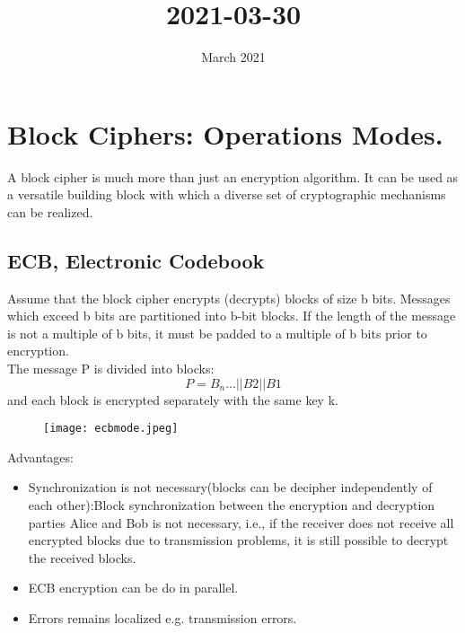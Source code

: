 \documentclass{article}
\title{2021-03-30}
\author{}
\date{March 2021}
\begin{document}
\maketitle

\section{Block Ciphers: Operations Modes.}
A block cipher is much more than just an encryption algorithm. It can be used as a versatile building block with which a diverse set of cryptographic mechanisms can be realized.

\subsection{ECB, Electronic Codebook}
Assume that the block cipher encrypts (decrypts)
blocks of size b bits. Messages which exceed b bits are partitioned into b-bit
blocks. If the length of the message is not a multiple of b bits, it must be padded to
a multiple of b bits prior to encryption.\\

The message P is divided into blocks:
$${P = B_n ... ||B2||B1}$$
and each block is encrypted separately with the same key k.
\begin{figure}[H]
    \centering
    \texttt{[image: ecbmode.jpeg]}
\end{figure}

Advantages:
\begin{itemize}
    \item Synchronization is not necessary(blocks can be decipher independently of each other):Block synchronization between the encryption
and decryption parties Alice and Bob is not necessary, i.e., if the receiver does not
receive all encrypted blocks due to transmission problems, it is still possible to decrypt
the received blocks.
    \item ECB encryption can be do in parallel.
    \item Errors remains localized e.g. transmission errors.
\end{itemize}
\end{document}
